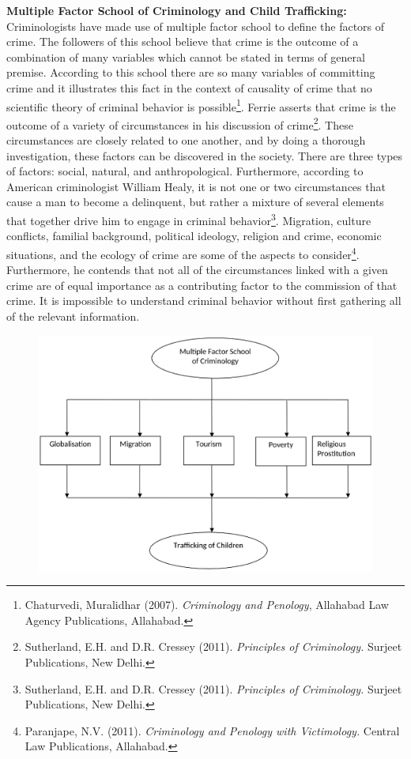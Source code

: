 \begin{multicols}{2}
\noi
\textbf{Multiple Factor School of Criminology and Child Trafficking:} Criminologists have made use of multiple factor school to define the factors of crime. The followers of this school believe that crime is the outcome of a combination of many variables which cannot be stated in terms of general premise. According to this school there are so many variables of committing crime and it illustrates this fact in the context of causality of crime that no scientific theory of criminal behavior is possible\footnote{Chaturvedi, Muralidhar (2007). \textit{Criminology and Penology}, Allahabad Law Agency Publications, Allahabad.}. Ferrie asserts that crime is the outcome of a variety of circumstances in his discussion of crime\footnote{Sutherland, E.H. and D.R. Cressey (2011). \textit{Principles of Criminology.} Surjeet Publications, New Delhi.}. These circumstances are closely related to one another, and by doing a thorough investigation, these factors can be discovered in the society. There are three types of factors: social, natural, and anthropological. Furthermore, according to American criminologist William Healy, it is not one or two circumstances that cause a man to become a delinquent, but rather a mixture of several elements that together drive him to engage in criminal behavior\footnote{Sutherland, E.H. and D.R. Cressey (2011). \textit{Principles of Criminology.} Surjeet Publications, New Delhi.}. Migration, culture conflicts, familial background, political ideology, religion and crime, economic situations, and the ecology of crime are some of the aspects to consider\footnote{Paranjape, N.V. (2011). \textit{Criminology and Penology with Victimology.} Central Law Publications, Allahabad.}. Furthermore, he contends that not all of the circumstances linked with a given crime are of equal importance as a contributing factor to the commission of that crime. It is impossible to understand criminal behavior without first gathering all of the relevant information.
\end{multicols}

\begin{figure}
\includegraphics[scale=1]{images/fig001.eps}
\end{figure}

